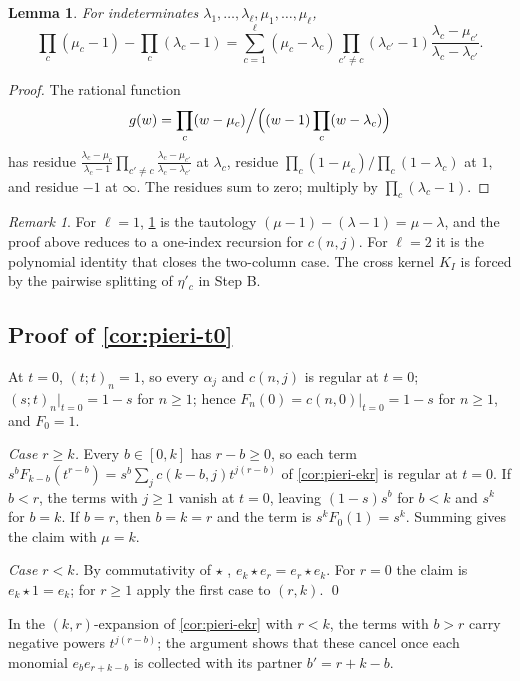 \documentclass[11pt]{amsart}
\newtheorem{lemma}[theorem]{Lemma}
\theoremstyle{definition}
\theoremstyle{remark}
\newtheorem{remark}[theorem]{Remark}
\numberwithin{equation}{section}
\begin{document}
\begin{lemma}\label{lem:Z}
For indeterminates $\lambda_1,\dots,\lambda_\ell,\mu_1,\dots,\mu_\ell$,
\[ \prod_c(\mu_c-1)-\prod_c(\lambda_c-1)=\sum_{c=1}^\ell(\mu_c-\lambda_c)\prod_{c'\ne c}(\lambda_{c'}-1)\frac{\lambda_c-\mu_{c'}}{\lambda_c-\lambda_{c'}} . \]
\end{lemma}
\begin{proof}
The rational function
\[ g(w)=\prod_c(w-\mu_c)\Big/\Bigl((w-1)\prod_c(w-\lambda_c)\Bigr) \]
has residue $\frac{\lambda_c-\mu_c}{\lambda_c-1}\prod_{c'\ne c}\frac{\lambda_c-\mu_{c'}}{\lambda_c-\lambda_{c'}}$ at $\lambda_c$, residue $\prod_c(1-\mu_c)/\prod_c(1-\lambda_c)$ at $1$, and residue $-1$ at $\infty$. The residues sum to zero; multiply by $\prod_c(\lambda_c-1)$.
\end{proof}

\begin{remark}
For $\ell=1$, \cref{lem:Z} is the tautology $(\mu-1)-(\lambda-1)=\mu-\lambda$, and the proof above reduces to a one-index recursion for $c(n,j)$. For $\ell=2$ it is the polynomial identity that closes the two-column case. The cross kernel $K_I$ is forced by the pairwise splitting of $\eta'_c$ in Step B.
\end{remark}

\subsection{Proof of \cref{cor:pieri-t0}}
At $t=0$, $(t;t)_n=1$, so every $\alpha_j$ and $c(n,j)$ is regular at $t=0$; $(s;t)_n|_{t=0}=1-s$ for $n\ge1$; hence $F_n(0)=c(n,0)|_{t=0}=1-s$ for $n\ge1$, and $F_0=1$.

\emph{Case $r\ge k$.} Every $b\in[0,k]$ has $r-b\ge0$, so each term $s^bF_{k-b}(t^{r-b})=s^b\sum_jc(k-b,j)t^{j(r-b)}$ of \cref{cor:pieri-ekr} is regular at $t=0$. If $b<r$, the terms with $j\ge1$ vanish at $t=0$, leaving $(1-s)s^b$ for $b<k$ and $s^k$ for $b=k$. If $b=r$, then $b=k=r$ and the term is $s^kF_0(1)=s^k$. Summing gives the claim with $\mu=k$.

\emph{Case $r<k$.} By commutativity of $\star$ \cite{Hikita25}, $e_k\star e_r=e_r\star e_k$. For $r=0$ the claim is $e_k\star1=e_k$; for $r\ge1$ apply the first case to $(r,k)$. \qed

\noindent In the $(k,r)$-expansion of \cref{cor:pieri-ekr} with $r<k$, the terms with $b>r$ carry negative powers $t^{j(r-b)}$; the argument shows that these cancel once each monomial $e_be_{r+k-b}$ is collected with its partner $b'=r+k-b$.
\end{document}
